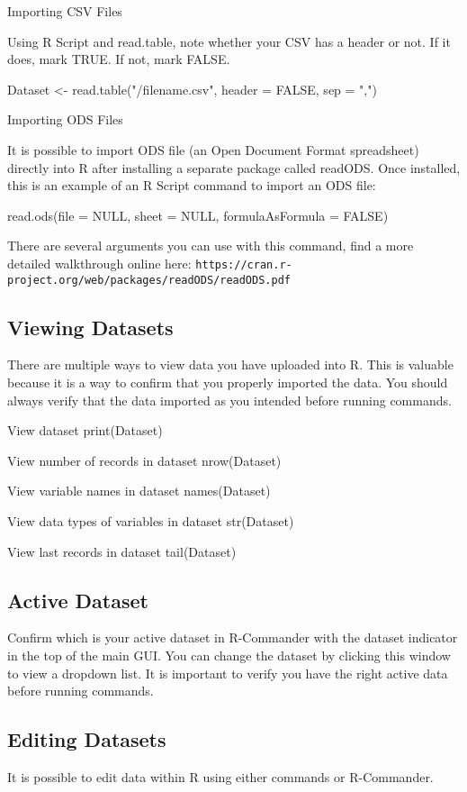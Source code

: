 Importing CSV Files

Using R Script and read.table, note whether your CSV has a header or not. If it does, mark TRUE. If not, mark FALSE.

Dataset <-  read.table("/filename.csv", header = FALSE, sep = ",")

Importing ODS Files

It is possible to import ODS file (an Open Document Format spreadsheet) directly into R after installing a separate package called readODS. Once installed, this is an example of an R Script command to import an ODS file:

read.ods(file = NULL, sheet = NULL, formulaAsFormula = FALSE)

There are several arguments you can use with this command, find a more detailed walkthrough online here: \texttt{https://cran.r-project.org/web/packages/readODS/readODS.pdf}

\subsection{Viewing Datasets}
There are multiple ways to view data you have uploaded into R. This is valuable because it is a way to confirm that you properly imported the data. You should always verify that the data imported as you intended before running commands.

View dataset
print(Dataset)

View number of records in dataset
nrow(Dataset)

View variable names in dataset
names(Dataset)

View data types of variables in dataset
str(Dataset)

View last records in dataset
tail(Dataset)

\subsection{Active Dataset}
Confirm which is your active dataset in R-Commander with the dataset indicator in the top of the main GUI. You can change the dataset by clicking this window to view a dropdown list. It is important to verify you have the right active data before running commands.

\subsection{Editing Datasets}
It is possible to edit data within R using either commands or R-Commander.